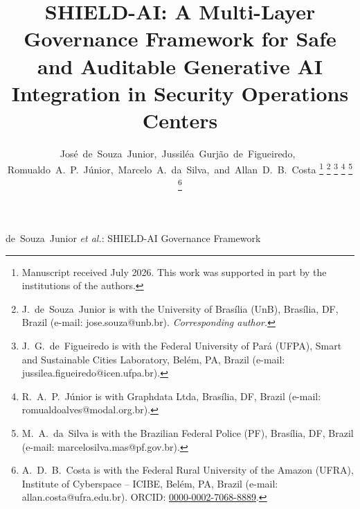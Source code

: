 \documentclass[journal]{IEEEtran}
\begin{document}
\sloppy

\title{SHIELD-AI: A Multi-Layer Governance Framework for Safe and Auditable Generative AI Integration in Security Operations Centers}

\author{José~de~Souza~Junior,~Jussiléa~Gurjão~de~Figueiredo,~%
Romualdo~A.~P.~Júnior,~Marcelo~A.~da~Silva,~and~Allan~D.~B.~Costa%
\thanks{Manuscript received July 2026. This work was supported in part by the
institutions of the authors.}%
\thanks{J.~de~Souza~Junior is with the University of Brasília (UnB), Brasília, DF, Brazil
(e-mail: jose.souza@unb.br). \emph{Corresponding author.}}%
\thanks{J.~G.~de~Figueiredo is with the Federal University of Pará (UFPA), Smart and
Sustainable Cities Laboratory, Belém, PA, Brazil
(e-mail: jussilea.figueiredo@icen.ufpa.br).}%
\thanks{R.~A.~P.~Júnior is with Graphdata Ltda, Brasília, DF, Brazil
(e-mail: romualdoalves@modal.org.br).}%
\thanks{M.~A.~da~Silva is with the Brazilian Federal Police (PF),
Brasília, DF, Brazil
(e-mail: marcelosilva.mas@pf.gov.br).}%
\thanks{A.~D.~B.~Costa is with the Federal Rural University of the Amazon (UFRA),
Institute of Cyberspace -- ICIBE, Belém, PA, Brazil
(e-mail: allan.costa@ufra.edu.br).
ORCID: \href{https://orcid.org/0000-0002-7068-8889}{0000-0002-7068-8889}.}%
}

%
{de~Souza~Junior \MakeLowercase{\textit{et al.}}: SHIELD-AI Governance Framework}

\maketitle
\end{document}
